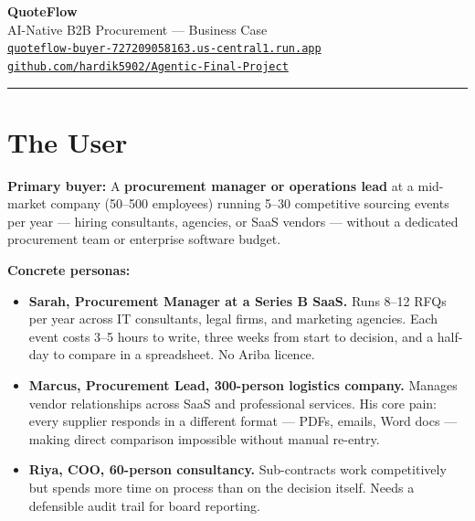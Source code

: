\documentclass[11pt, a4paper]{article}
\begin{document}
\begin{center}
  {\fontsize{28}{34}\selectfont\bfseries\color{brand}QuoteFlow}\\[5pt]
  {\large\color{muted}AI-Native B2B Procurement --- Business Case}\\[8pt]
  {\small\color{muted}
    \href{https://quoteflow-buyer-727209058163.us-central1.run.app}%
         {\texttt{quoteflow-buyer-727209058163.us-central1.run.app}}
    \enspace\textbullet\enspace
    \href{https://github.com/hardik5902/Agentic-Final-Project}%
         {\texttt{github.com/hardik5902/Agentic-Final-Project}}
  }
\end{center}
\vspace{2pt}
\textcolor{brand}{\rule{\linewidth}{2pt}}
\vspace{4pt}

\section{The User}

\textbf{Primary buyer:} A \textbf{procurement manager or operations lead} at a
mid-market company (50--500 employees) running 5--30 competitive sourcing events
per year --- hiring consultants, agencies, or SaaS vendors --- without a dedicated
procurement team or enterprise software budget.

\medskip
\textbf{Concrete personas:}

\begin{itemize}
  \item \textbf{Sarah, Procurement Manager at a Series B SaaS.}
    Runs 8--12 RFQs per year across IT consultants, legal firms, and marketing
    agencies. Each event costs 3--5 hours to write, three weeks from start to
    decision, and a half-day to compare in a spreadsheet. No Ariba licence.

  \item \textbf{Marcus, Procurement Lead, 300-person logistics company.}
    Manages vendor relationships across SaaS and professional services. His core
    pain: every supplier responds in a different format --- PDFs, emails, Word docs
    --- making direct comparison impossible without manual re-entry.

  \item \textbf{Riya, COO, 60-person consultancy.}
    Sub-contracts work competitively but spends more time on process than on the
    decision itself. Needs a defensible audit trail for board reporting.
\end{itemize}
\end{document}
